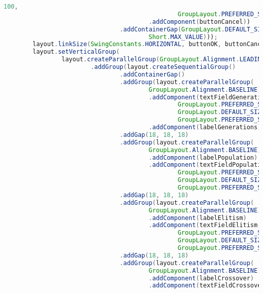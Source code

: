 \begin{lstlisting}[language=Java,basicstyle=\tiny,caption=GeneticParameters.java]
                                                100, 
                                                GroupLayout.PREFERRED_SIZE)
                                        .addComponent(buttonCancel))
                                .addContainerGap(GroupLayout.DEFAULT_SIZE,
                                        Short.MAX_VALUE)));
        layout.linkSize(SwingConstants.HORIZONTAL, buttonOK, buttonCancel);
        layout.setVerticalGroup(
                layout.createParallelGroup(GroupLayout.Alignment.LEADING)
                        .addGroup(layout.createSequentialGroup()
                                .addContainerGap()
                                .addGroup(layout.createParallelGroup(
                                        GroupLayout.Alignment.BASELINE)
                                        .addComponent(textFieldGenerations,
                                                GroupLayout.PREFERRED_SIZE,
                                                GroupLayout.DEFAULT_SIZE,
                                                GroupLayout.PREFERRED_SIZE)
                                        .addComponent(labelGenerations))
                                .addGap(18, 18, 18)
                                .addGroup(layout.createParallelGroup(
                                        GroupLayout.Alignment.BASELINE)
                                        .addComponent(labelPopulation)
                                        .addComponent(textFieldPopulation,
                                                GroupLayout.PREFERRED_SIZE,
                                                GroupLayout.DEFAULT_SIZE,
                                                GroupLayout.PREFERRED_SIZE))
                                .addGap(18, 18, 18)
                                .addGroup(layout.createParallelGroup(
                                        GroupLayout.Alignment.BASELINE)
                                        .addComponent(labelElitism)
                                        .addComponent(textFieldElitism,
                                                GroupLayout.PREFERRED_SIZE,
                                                GroupLayout.DEFAULT_SIZE,
                                                GroupLayout.PREFERRED_SIZE))
                                .addGap(18, 18, 18)
                                .addGroup(layout.createParallelGroup(
                                        GroupLayout.Alignment.BASELINE)
                                        .addComponent(labelCrossover)
                                        .addComponent(textFieldCrossover,

\end{lstlisting}
